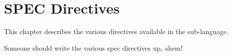 
\chapter{SPEC Directives}
\label{sec:spec}

This chapter describes the various directives available
in the  sub-language.  

Someone should write the various spec directives up, ahem!


